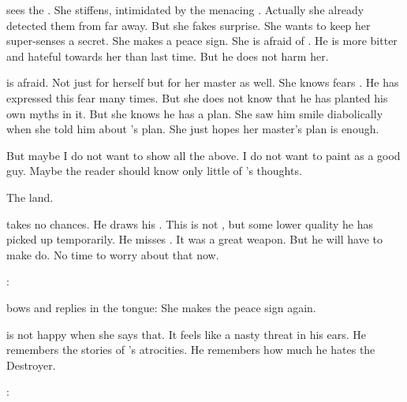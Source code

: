 \begin{comment}
  \section{Criseis is afraid}
\end{comment}
\new
\Criseis sees the \resphain.
She stiffens, intimidated by the menacing \resphain. 
Actually she already detected them from far away.
But she fakes surprise.
She wants to keep her super-senses a secret. 
She makes a peace sign.
She is afraid of \Teshrial.
He is more bitter and hateful towards her than last time. 
But he does not harm her. 

\Criseis is afraid.
Not just for herself but for her master as well.
She knows \Ishnaruchaefir fears \WanderersInDarknessEmph.
He has expressed this fear many times. 
But she does not know that he has planted his own myths in it.
But she knows he has a plan.
She saw him smile diabolically when she told him about \Teshrial's plan.
She just hopes her master's plan is enough.

But maybe I do not want to show all the above. 
I do not want to paint \Ishnaruchaefir as a good guy.
Maybe the reader should know only little of \Criseis's thoughts. 



\begin{comment}
  \section{The Resphain land}
\end{comment}
\new
The \resphain land. 

\Teshrial takes no chances.
He draws his \senaan. 
This is not \Turishah, but some lower quality \senaan he has picked up temporarily.
He misses \Turishah.
It was a great weapon.
But he will have to make do.
No time to worry about that now. 

\Teshrial:

\Criseis bows and replies in the \resphan tongue:
She makes the peace sign again.
  
\Teshrial is not happy when she says that.
It feels like a nasty threat in his ears. 
He remembers the stories of \Ishnaruchaefir's atrocities. 
He remembers how much he hates the Destroyer. 

\Criseis:

